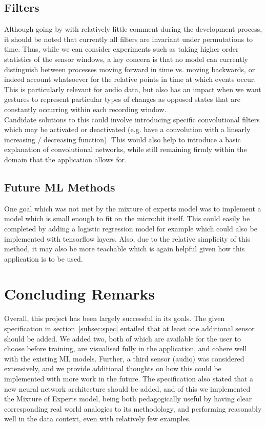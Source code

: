 \documentclass{article}
\begin{document}
\subsection{Filters}%
\label{subsec:filters}

Although going by with relatively little comment during the development process, it should be noted that currently all filters are invariant under permutations to time. Thus, while we can consider experiments such as taking higher order statistics of the sensor windows, a key concern is that no model can currently distinguish between processes moving forward in time vs. moving backwards, or indeed account whatsoever for the relative points in time at which events occur. This is particularly relevant for audio data, but also has an impact when we want gestures to represent particular types of changes as opposed states that are constantly occurring within each recording window. \\

Candidate solutions to this could involve introducing specific convolutional filters which may be activated or deactivated (e.g. have a convolution with a linearly increasing / decreasing function). This would also help to introduce a basic explanation of convolutional networks, while still remaining firmly within the domain that the application allows for.

\subsection{Future ML Methods}
One goal which was not met by the mixture of experts model was to implement a model which is small enough to fit on the micro:bit itself. This could easily be completed by adding a logistic regression model for example which could also be implemented with tensorflow layers. Also, due to the relative simplicity of this method, it may also be more teachable which is again helpful given how this application is to be used.


\section{Concluding Remarks}%
\label{sec:conclusion}

Overall, this project has been largely successful in its goals. The given specification in section~\ref{subsec:spec} entailed that at least one additional sensor should be added. We added two, both of which are available for the user to choose before training, are visualised fully in the application, and cohere well with the existing ML models. Further, a third sensor (audio) was considered extensively, and we provide additional thoughts on how this could be implemented with more work in the future. The specification also stated that a new neural network architecture should be added, and of this we implemented the Mixture of Experts model, being both pedagogically useful by having clear corresponding real world analogies to its methodology, and performing reasonably well in the data context, even with relatively few examples. \\
\end{document}
